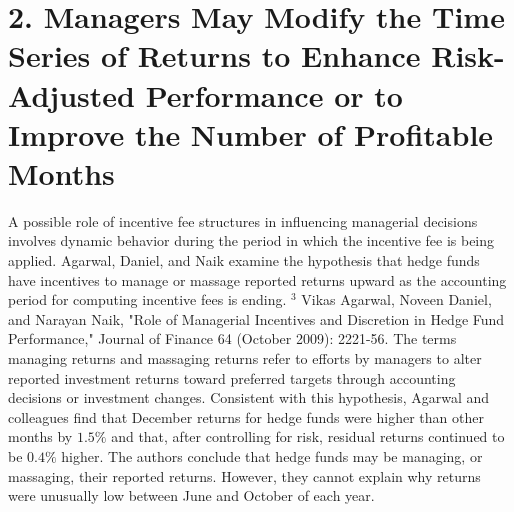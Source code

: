 \documentclass[11pt]{article}
\begin{document}
\section*{2. Managers May Modify the Time Series of Returns to Enhance Risk-Adjusted Performance or to Improve the Number of Profitable Months}
A possible role of incentive fee structures in influencing managerial decisions involves dynamic behavior during the period in which the incentive fee is being applied. Agarwal, Daniel, and Naik examine the hypothesis that hedge funds have incentives to manage or massage reported returns upward as the accounting period for computing incentive fees is ending. ${ }^{3}$ Vikas Agarwal, Noveen Daniel, and Narayan Naik, "Role of Managerial Incentives and Discretion in Hedge Fund Performance," Journal of Finance 64 (October 2009): 2221-56. The terms managing returns and massaging returns refer to efforts by managers to alter reported investment returns toward preferred targets through accounting decisions or investment changes. Consistent with this hypothesis, Agarwal and colleagues find that December returns for hedge funds were higher than other months by $1.5 \%$ and that, after controlling for risk, residual returns continued to be $0.4 \%$ higher. The authors conclude that hedge funds may be managing, or massaging, their reported returns. However, they cannot explain why returns were unusually low between June and October of each year.
\end{document}
